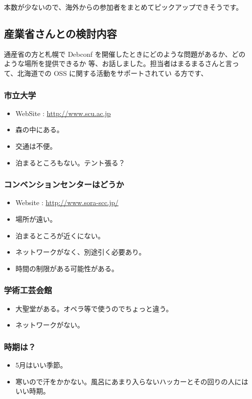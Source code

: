\documentclass[mingoth,a4paper]{jsarticle}
\begin{document}
本数が少ないので、海外からの参加者をまとめてピックアップできそうです。

\subsection{産業省さんとの検討内容}
通産省の方と札幌で Debconf を開催したときにどのような問題があるか、どのような場所を提供できるか
等、お話しました。担当者はまるまるさんと言って、北海道での OSS に関する活動をサポートされてい
る方です、

\subsubsection{市立大学}
\begin{itemize}
	\item WebSite : \url{http://www.scu.ac.jp}
	\item 森の中にある。
	\item 交通は不便。
	\item 泊まるところもない。テント張る？
\end{itemize}

\subsubsection{コンベンションセンターはどうか}

\begin{itemize}
	\item Website : \url{http://www.sora-scc.jp/}
	\item 場所が遠い。
	\item 泊まるところが近くにない。
	\item ネットワークがなく、別途引く必要あり。
	\item 時間の制限がある可能性がある。	
\end{itemize}


\subsubsection{学術工芸会館}
\begin{itemize}
	\item 大聖堂がある。オペラ等で使うのでちょっと違う。
	\item ネットワークがない。
\end{itemize}

\subsubsection{時期は？}
\begin{itemize}
	\item 5月はいい季節。
	\item 寒いので汗をかかない。風呂にあまり入らないハッカーとその回りの人にはいい時期。
\end{itemize}
	
\end{document}
